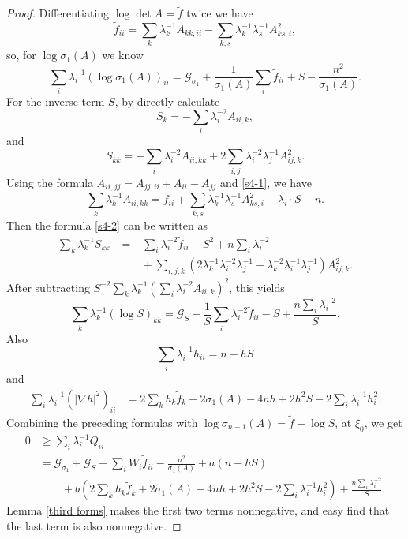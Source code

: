 \documentclass[10pt,a4paper]{amsart}
\begin{document}
\begin{proof}
Differentiating $\log\det A=\tilde f$ twice we have
\begin{equation}\label{s4-1}
        \tilde f_{ii}
        =\sum_k\lambda_k^{-1}A_{kk,ii}
        -\sum_{k,s}\lambda_k^{-1}\lambda_s^{-1}A_{ks,i}^2,
\end{equation}
so, for $\log\sigma_1(A)$ we know
\[
        \sum_i\lambda_i^{-1}(\log\sigma_1(A))_{ii}
        =\mathcal G_{\sigma_1}+\frac{1}{\sigma_1(A)}\sum_i\tilde f_{ii}
        +S-\frac{n^2}{\sigma_1(A)}.
\]
For the inverse term $S$, by directly calculate
\[
        S_k=-\sum_i\lambda_i^{-2}A_{ii,k},
\]
and
\begin{equation}\label{s4-2}
        S_{kk}
        =-\sum_i\lambda_i^{-2}A_{ii,kk}
        +2\sum_{i,j}\lambda_i^{-2}\lambda_j^{-1}A_{ij,k}^2.
\end{equation}
Using the formula $A_{ii,jj}=A_{jj,ii}+A_{ii}-A_{jj}$ and \eqref{s4-1}, we have
\[
        \sum_k\lambda_k^{-1}A_{ii,kk}
        =\tilde f_{ii}
        +\sum_{k,s}\lambda_k^{-1}\lambda_s^{-1}A_{ks,i}^2
        +\lambda_i\cdot S-n.
\]
Then the formula \eqref{s4-2} can be written as
\[
\begin{split}
        \sum_k\lambda_k^{-1}S_{kk}
        &=-\sum_i\lambda_i^{-2}\tilde f_{ii}
        -S^2+n\sum_i\lambda_i^{-2}\\
        &\qquad
        +\sum_{i,j,k}
        \left(2\lambda_k^{-1}\lambda_i^{-2}\lambda_j^{-1}
        -\lambda_k^{-2}\lambda_i^{-1}\lambda_j^{-1}\right)A_{ij,k}^2.
\end{split}
\]
After subtracting $S^{-2}\sum_k\lambda_k^{-1}
(\sum_i\lambda_i^{-2}A_{ii,k})^2$, this yields
\begin{equation}\label{contracted log S}
        \sum_k\lambda_k^{-1}(\log S)_{kk}
        =\mathcal G_S-\frac{1}{S}\sum_i\lambda_i^{-2}\tilde f_{ii}
        -S+\frac{n\sum_i\lambda_i^{-2}}{S}.
\end{equation}
Also
\[
        \sum_i\lambda_i^{-1}h_{ii}=n-hS
\]
and
\[
\begin{split}
        \sum_i\lambda_i^{-1}(|\nabla h|^2)_{ii}
        &=2\sum_kh_k\tilde f_k+2\sigma_1(A)-4nh
        +2h^2S-2\sum_i\lambda_i^{-1}h_i^2.
\end{split}
\]
Combining the preceding formulas with $\log\sigma_{n-1}(A)=\tilde f+\log S$, at $\xi_0$,
we get
\begin{equation}\label{contracted Q}
\begin{split}
        0&\geq\sum_i\lambda_i^{-1}Q_{ii}\\
        &=\mathcal G_{\sigma_1}+\mathcal G_S+\sum_iW_i\tilde f_{ii}
        -\frac{n^2}{\sigma_1(A)}+a(n-hS)\\
        &\qquad
        +b\left(2\sum_kh_k\tilde f_k+2\sigma_1(A)-4nh
        +2h^2S-2\sum_i\lambda_i^{-1}h_i^2\right)
        +\frac{n\sum_i\lambda_i^{-2}}{S}.
\end{split}
\end{equation}
Lemma \ref{third forms} makes the first two terms nonnegative, and easy find that the last term is also
nonnegative.


\end{proof}
\end{document}

